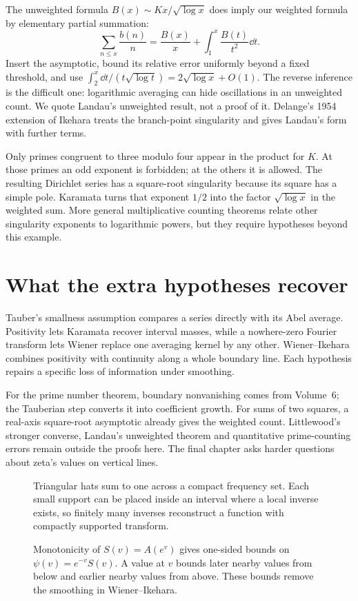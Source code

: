 \begin{remark}
The unweighted formula $B(x)\sim Kx/\sqrt{\log x}$ does imply our weighted formula by elementary partial summation:
\[\sum_{n\le x}\frac{b(n)}n=\frac{B(x)}x+\int_1^x\frac{B(t)}{t^2}\dd t.
\]
Insert the asymptotic, bound its relative error uniformly beyond a fixed threshold, and use $\int_2^x\dd t/(t\sqrt{\log t})=2\sqrt{\log x}+O(1)$. The reverse inference is the difficult one: logarithmic averaging can hide oscillations in an unweighted count. We quote Landau's unweighted result, not a proof of it. Delange's 1954 extension of Ikehara treats the branch-point singularity and gives Landau's form with further terms.
\end{remark}

\begin{beauty}
Only primes congruent to three modulo four appear in the product for $K$. At those primes an odd exponent is forbidden; at the others it is allowed. The resulting Dirichlet series has a square-root singularity because its square has a simple pole. Karamata turns that exponent $1/2$ into the factor $\sqrt{\log x}$ in the weighted sum. More general multiplicative counting theorems relate other singularity exponents to logarithmic powers, but they require hypotheses beyond this example.
\end{beauty}

\section{What the extra hypotheses recover}

Tauber's smallness assumption compares a series directly with its Abel average. Positivity lets Karamata recover interval masses, while a nowhere-zero Fourier transform lets Wiener replace one averaging kernel by any other. Wiener--Ikehara combines positivity with continuity along a whole boundary line. Each hypothesis repairs a specific loss of information under smoothing.

For the prime number theorem, boundary nonvanishing comes from Volume~6; the Tauberian step converts it into coefficient growth. For sums of two squares, a real-axis square-root asymptotic already gives the weighted count. Littlewood's stronger converse, Landau's unweighted theorem and quantitative prime-counting errors remain outside the proofs here. The final chapter asks harder questions about zeta's values on vertical lines.

\begin{figure}[ht]
\centering{}
\caption{Triangular hats sum to one across a compact frequency set. Each small support can be placed inside an interval where a local inverse exists, so finitely many inverses reconstruct a function with compactly supported transform.}
\label{fig:v8c15local}
\end{figure}
\begin{figure}[ht]
\centering{}
\caption{Monotonicity of $S(v)=A(e^v)$ gives one-sided bounds on $\psi(v)=e^{-v}S(v)$. A value at $v$ bounds later nearby values from below and earlier nearby values from above. These bounds remove the smoothing in Wiener--Ikehara.}
\label{fig:v8c15onesided}
\end{figure}
